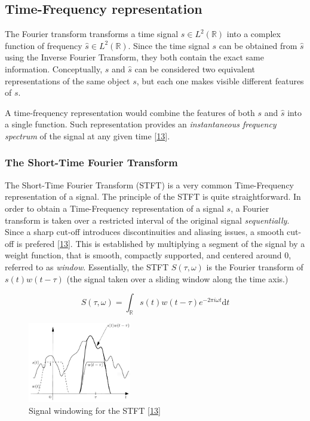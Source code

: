 \documentclass[american,]{article}
\theoremstyle{definition}
\theoremstyle{definition}
\theoremstyle{definition}
\theoremstyle{remark}
\begin{document}
\hypertarget{time-frequency-representation}{%
\subsection{Time-Frequency representation}\label{time-frequency-representation}}

The Fourier transform transforms a time signal \(s\in L^2(\mathbb{R})\)
into a complex function of frequency \(\hat s\in L^2(\mathbb{R})\).
Since the time signal \(s\) can be obtained from \(\hat s\)
using the Inverse Fourier Transform, they both contain
the exact same information.
Conceptually, \(s\) and \(\hat s\) can be considered two equivalent
representations of the same object \(s\), but each one
makes visible different features of \(s\).

A time-frequency representation would combine the features
of both \(s\) and \(\hat s\) into a single function.
Such representation provides an \emph{instantaneous frequency spectrum}
of the signal at any given time {[}\protect\hyperlink{ref-grochenig2001}{13}{]}.

\hypertarget{the-short-time-fourier-transform}{%
\subsubsection{The Short-Time Fourier Transform}\label{the-short-time-fourier-transform}}

The Short-Time Fourier Transform (STFT) is a very common
Time-Frequency representation of a signal.
The principle of the STFT is quite straightforward.
In order to obtain a Time-Frequency representation of a signal \(s\),
a Fourier transform is taken over a restricted interval
of the original signal \emph{sequentially}.
Since a sharp cut-off introduces discontinuities and aliasing issues,
a smooth cut-off is prefered {[}\protect\hyperlink{ref-grochenig2001}{13}{]}.
This is established by multiplying a segment of the signal by a weight function,
that is smooth, compactly supported, and centered around \(0\),
referred to as \emph{window}.
Essentially, the STFT \(S(\tau,\omega)\) is the Fourier transform of \(s(t)w(t-\tau)\)
(the signal taken over a sliding window along the time axis.)

\begin{equation}
S(\tau,\omega) = \int_\mathbb{R}s(t)w(t-\tau)e^{-2\pi i\omega t} \mathrm{d}t
\end{equation}

\begin{figure}
\centering
\includegraphics[width=0.4\textwidth,height=\textheight]{img/stft_grochenig.png}
\caption{Signal windowing for the STFT {[}\protect\hyperlink{ref-grochenig2001}{13}{]}}
\end{figure}
\end{document}
